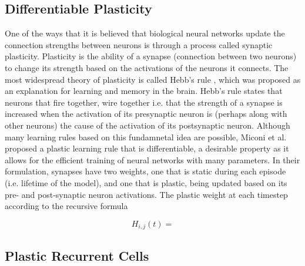 \subsection*{Differentiable Plasticity}

One of the ways that it is believed that biological neural networks update the connection strengths between neurons is through a process called synaptic plasticity. Plasticity is the ability of a synapse (connection between two neurons) to change its strength based on the activations of the neurons it connects. The most widespread theory of plasticity is called Hebb's rule \cite{hebb1949rule}, which was proposed as an explanation for learning and memory in the brain. Hebb's rule states that neurons that fire together, wire together i.e. that the strength of a synapse is increased when the activation of its presynaptic neuron is (perhaps along with other neurons) the cause of the activation of its postsynaptic neuron. Although many learning rules based on this fundamnetal idea are possible, Miconi et al. \cite{miconi2018diffplas} proposed a plastic learning rule that is differentiable, a desirable property as it allows for the efficient training of neural networks with many parameters. In their formulation, synapses have two weights, one that is static during each episode (i.e. lifetime of the model), and one that is plastic, being updated based on its pre- and post-synaptic neuron activations. The plastic weight at each timestep according to the recursive formula

\[ H_{i,j}(t) = \]

\subsection*{Plastic Recurrent Cells}